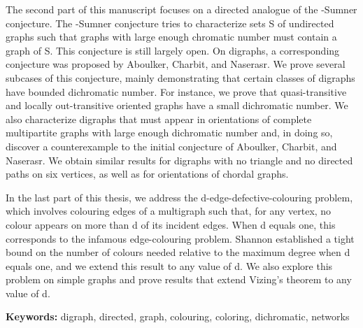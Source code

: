 {\vspace{0.2cm}
The second part of this manuscript focuses on a directed analogue of the \Gya-Sumner conjecture. The \Gya-Sumner conjecture tries to characterize sets S of undirected graphs such that graphs with large enough chromatic number must contain a graph of S. This conjecture is still largely open. On digraphs, a corresponding conjecture was proposed by Aboulker, Charbit, and Naserasr. We prove several subcases of this conjecture, mainly demonstrating that certain classes of digraphs have bounded dichromatic number. For instance, we prove that quasi-transitive and locally out-transitive oriented graphs have a small dichromatic number. We also characterize digraphs that must appear in orientations of complete multipartite graphs with large enough dichromatic number and, in doing so, discover a counterexample to the initial conjecture of Aboulker, Charbit, and Naserasr. We obtain similar results for digraphs with no triangle and no directed paths on six vertices, as well as for orientations of chordal graphs.

\vspace{0.2cm}
In the last part of this thesis, we address the d-edge-defective-colouring problem, which involves colouring edges of a multigraph such that, for any vertex, no colour appears on more than d of its incident edges. When d equals one, this corresponds to the infamous edge-colouring problem. Shannon established a tight bound on the number of colours needed relative to the maximum degree when d equals one, and we extend this result to any value of d. We also explore this problem on simple graphs and prove results that extend Vizing's theorem to any value of d.

}

\vspace{0.6cm}

\noindent\textbf{Keywords:} digraph,  directed,  graph,  colouring,  coloring,  dichromatic, networks\\

\restoregeometry





